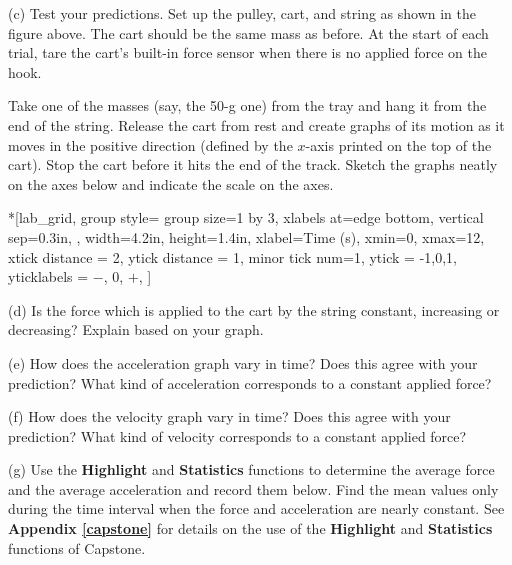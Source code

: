 (c) Test your predictions. Set up the pulley, cart, and string as shown in the figure above. 
The cart should be the same mass as before. At the start of each trial, tare the cart's built-in force sensor when there is no applied force on the hook.  

Take one of the masses (say, the 50-g one) from the tray and hang it from the end of the string.  Release the cart from rest and create graphs of its motion as it moves in the positive direction (defined by the $x$-axis printed on the top of the cart). Stop the cart before it hits the end of the track. Sketch the graphs neatly on the axes below and indicate the scale on the axes.

\begin{lab_groupplot}*{}[lab_grid,
	group style={
		group size=1 by 3,
		xlabels at=edge bottom,
		vertical sep=0.3in,
		},
	width=4.2in,  height=1.4in,
	xlabel=Time (s),
	xmin=0, xmax=12,
	xtick distance = 2, 
	ytick distance = 1, 
	minor tick num=1,
	ytick = {-1,0,1},
	yticklabels = {$-$, 0, $+$},
	]
\nextgroupplot[
	ymin=-1,ymax=1, 
	ylabel={Velocity (m/s)},
	]
\nextgroupplot[
	ymin=-1,ymax=1, 
	ylabel={Acceleration (m/s$^2$)},
	]
\nextgroupplot[
	ymin=-1,ymax=1, 
	ylabel={Force (N)},
	]
\end{lab_groupplot} 

(d) Is the force which is applied to the cart by the string constant, increasing
or decreasing? Explain based on your graph.
\answerspace{15mm}

\pagebreak[2]
(e) How does the acceleration graph vary in time? Does this agree with your
prediction? What kind of acceleration corresponds to a constant applied force?
\answerspace{20mm}

(f) How does the velocity graph vary in time? Does this agree with your prediction?
What kind of velocity corresponds to a constant applied force?
\answerspace{20mm}

(g) Use the \textbf{Highlight} and \textbf{Statistics} functions to determine 
the average force and the average acceleration and record them below. Find the mean values only during the time interval when the force and acceleration are nearly constant. See \textbf{Appendix \ref{capstone}} for details on the use of the \textbf{Highlight} and  \textbf{Statistics} functions of Capstone.
\answerspace{20mm}


